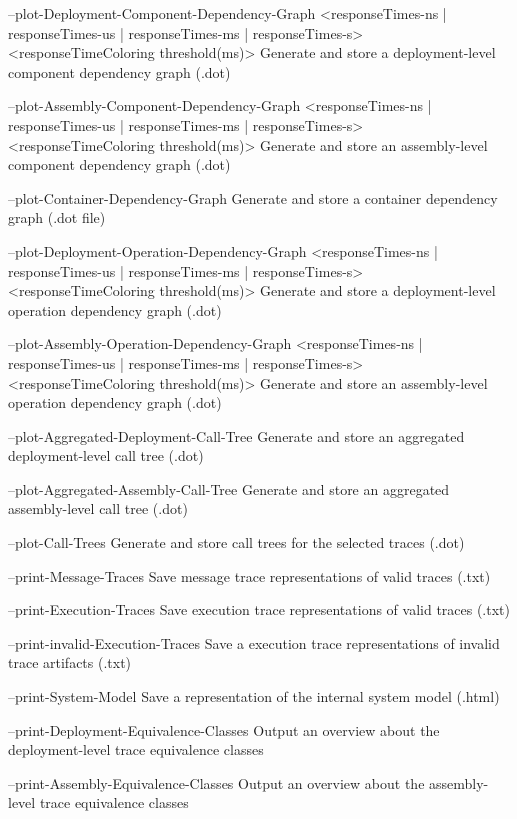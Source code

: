     --plot-Deployment-Component-Dependency-Graph <responseTimes-ns | responseTimes-us | responseTimes-ms | responseTimes-s> <responseTimeColoring threshold(ms)>
        Generate and store a deployment-level component dependency graph
        (.dot)

    --plot-Assembly-Component-Dependency-Graph <responseTimes-ns | responseTimes-us | responseTimes-ms | responseTimes-s> <responseTimeColoring threshold(ms)>
        Generate and store an assembly-level component dependency graph
        (.dot)

    --plot-Container-Dependency-Graph
        Generate and store a container dependency graph (.dot file)

    --plot-Deployment-Operation-Dependency-Graph <responseTimes-ns | responseTimes-us | responseTimes-ms | responseTimes-s> <responseTimeColoring threshold(ms)>
        Generate and store a deployment-level operation dependency graph
        (.dot)

    --plot-Assembly-Operation-Dependency-Graph <responseTimes-ns | responseTimes-us | responseTimes-ms | responseTimes-s> <responseTimeColoring threshold(ms)>
        Generate and store an assembly-level operation dependency graph
        (.dot)

    --plot-Aggregated-Deployment-Call-Tree
        Generate and store an aggregated deployment-level call tree (.dot)

    --plot-Aggregated-Assembly-Call-Tree
        Generate and store an aggregated assembly-level call tree (.dot)

    --plot-Call-Trees
        Generate and store call trees for the selected traces (.dot)

    --print-Message-Traces
        Save message trace representations of valid traces (.txt)

    --print-Execution-Traces
        Save execution trace representations of valid traces (.txt)

    --print-invalid-Execution-Traces
        Save a execution trace representations of invalid trace artifacts
        (.txt)

    --print-System-Model
        Save a representation of the internal system model (.html)

    --print-Deployment-Equivalence-Classes
        Output an overview about the deployment-level trace equivalence
        classes

    --print-Assembly-Equivalence-Classes
        Output an overview about the assembly-level trace equivalence
        classes

